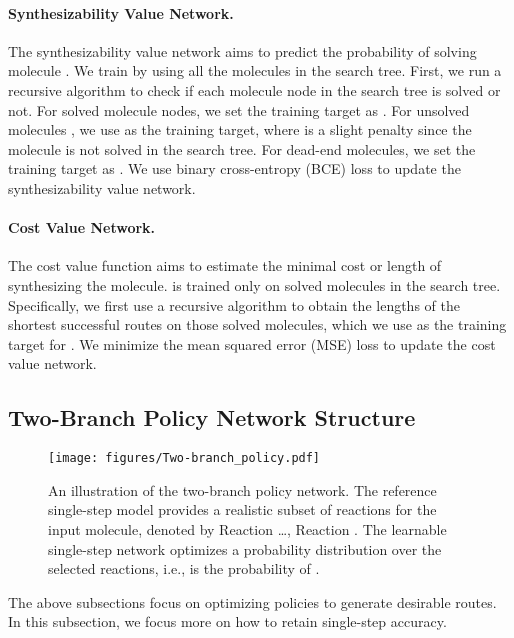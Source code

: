 \documentclass[nohyperref]{article}
\theoremstyle{plain}
\theoremstyle{definition}
\theoremstyle{remark}
\begin{document}
\paragraph{Synthesizability Value Network.}
The synthesizability value network  aims to predict the probability of solving molecule . 
We train  by using all the molecules in the search tree. 
First, we run a recursive algorithm to check if each molecule node in the search tree is solved or not. For solved molecule nodes, we set the training target as . 
For unsolved molecules , we use  as the training target, where  is a slight penalty since the molecule is not solved in the search tree.
For dead-end molecules, we set the training target as . 
We use binary cross-entropy (BCE) loss to update the synthesizability value network.


\paragraph{Cost Value Network.}
The cost value function  aims to estimate the minimal cost or length of synthesizing the molecule. 
 is trained only on solved molecules in the search tree.
Specifically, we first use a recursive algorithm to obtain the lengths of the shortest successful routes on those solved molecules, which we use as the training target for . 
We minimize the mean squared error (MSE) loss to update the cost value network.


\subsection{Two-Branch Policy Network Structure}\label{sec:realistic} 



\begin{figure}[t]
\centerline{\texttt{[image: figures/Two-branch\_policy.pdf]}}
\caption{An illustration of the two-branch policy network. The reference single-step model provides a realistic subset of reactions for the input molecule, denoted by Reaction  \dots, Reaction  . 
The learnable single-step network optimizes a probability distribution over the selected reactions, i.e.,  is the probability of .}
\label{fig:two-branch}
\end{figure}



The above subsections focus on optimizing policies to generate desirable routes. 
In this subsection, we focus more on how to retain single-step accuracy.
\end{document}
